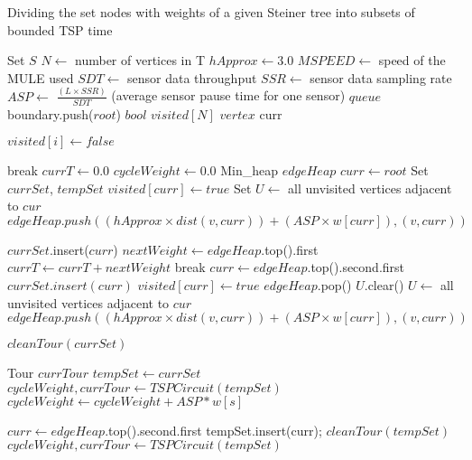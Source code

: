 \begin{algorithm}
\caption{Dividing the set nodes with weights of a given Steiner tree into subsets of bounded TSP time}\label{euclid}
\begin{algorithmic}
\State Set  $S$
\State $N \gets$ number of vertices in T
\State $hApprox \gets 3.0$
\State $MSPEED \gets$ speed of the MULE used
\State $SDT \gets$ sensor data throughput
\State $SSR \gets$ sensor data sampling rate
\State $ASP \gets$ $\frac{(L\times SSR)}{SDT}$ (average sensor pause time for one sensor)
\State $queue$ boundary.push($root$) 
\State $bool$ $visited[N]$
\State $vertex$ curr 

\end{algorithmic}
\end{algorithm}

\begin{algorithm}
\begin{algorithmic}

	\State $visited[i] \gets false$ 
\EndFor

		\State break
	\EndIf
	\State $currT \gets 0.0$ 
	\State $cycleWeight \gets 0.0$ 
	\State Min\_heap $edgeHeap$  
	\State $curr \gets root$ 
	\State Set $currSet$, $tempSet$ 
	\State $visited[curr] \gets true$ 
	\State Set $U \gets$ all unvisited vertices adjacent to $cur$ 
		\State $edgeHeap.push((hApprox \times dist(v,curr)) + (ASP\times w[curr]) , (v,curr))$ 
	\EndFor

	\State $currSet$.insert($curr$) 
		\State $nextWeight \gets edgeHeap$.top().first 
		\State $currT \gets currT + nextWeight$ 
			break 
		\EndIf
		\State $curr \gets edgeHeap$.top().second.first 
		\State $currSet.insert(curr)$ 
		\State $visited[curr] \gets true$ 
		\State $edgeHeap$.pop() 
		\State $U$.clear() 
		\State $U \gets$ all unvisited vertices adjacent to $cur$ 
			\State $edgeHeap.push((hApprox \times dist(v,curr)) + (ASP\times w[curr]) , (v,curr))$ 
		\EndFor
	\EndWhile

	\State $cleanTour(currSet)$
	
	\State Tour $currTour$ 
	\State $tempSet \gets currSet$ 
	\State $cycleWeight , currTour \gets TSPCircuit(tempSet)$
		$cycleWeight \gets cycleWeight + ASP*w[s]$
	\EndFor
	
		\State $curr \gets edgeHeap$.top().second.first 
		\State tempSet.insert(curr);
		\State $cleanTour(tempSet)$
		\State $cycleWeight, currTour \gets TSPCircuit(tempSet)$ 

\end{algorithmic}
\end{algorithm}

